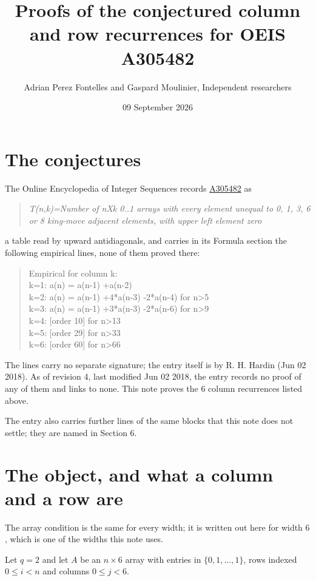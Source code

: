\documentclass[11pt]{article}
\title{Proofs of the conjectured column and row recurrences for OEIS A305482}
\author{Adrian Perez Fontelles and Gaspard Moulinier, Independent researchers}
\date{09 September 2026}
\theoremstyle{definition}
\begin{document}
\maketitle
\section{The conjectures}

The Online Encyclopedia of Integer Sequences records \href{https://oeis.org/A305482}{A305482} as

\begin{quote}\itshape T(n,k)=Number of nXk 0..1 arrays with every element unequal to 0, 1, 3, 6 or 8 king-move adjacent elements, with upper left element zero\end{quote}

a table read by upward antidiagonals, and carries in its Formula section the following empirical lines, none of them proved there:

\begin{quote}\ttfamily Empirical for column k:\\
k=1: a(n) = a(n-1) +a(n-2)\\k=2: a(n) = a(n-1) +4*a(n-3) -2*a(n-4) for n>5\\k=3: a(n) = a(n-1) +3*a(n-3) -2*a(n-6) for n>9\\k=4: [order 10] for n>13\\k=5: [order 29] for n>33\\k=6: [order 60] for n>66\end{quote}

The lines carry no separate signature; the entry itself is by R. H. Hardin (Jun 02 2018). As of revision 4, last modified Jun 02 2018, the entry records no proof of any of them and links to none. This note proves the 6 column recurrences listed above.

The entry also carries further lines of the same blocks that this note does not settle; they are named in Section 6.

\section{The object, and what a column and a row are}

The array condition is the same for every width; it is written out here for width $6$, which is one of the widths this note uses.

Let $q = 2$ and let $A$ be an $n \times 6$ array with entries in $\{0,1,\dots,1\}$, rows indexed $0 \le i < n$ and columns $0 \le j < 6$.
\end{document}
